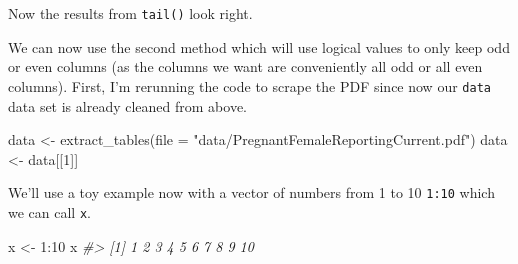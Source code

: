 \documentclass[
]{krantz}
\makeatletter
\newenvironment{Shaded}{\begin{snugshade}}{\end{snugshade}}
\newcommand{\AttributeTok}[1]{\textcolor[rgb]{0.61,0.61,0.61}{#1}}
\newcommand{\CommentTok}[1]{\textcolor[rgb]{0.37,0.37,0.37}{\textit{#1}}}
\newcommand{\DecValTok}[1]{\textcolor[rgb]{0.06,0.06,0.06}{#1}}
\newcommand{\FunctionTok}[1]{\textcolor[rgb]{0,0,0}{#1}}
\newcommand{\NormalTok}[1]{#1}
\newcommand{\OtherTok}[1]{\textcolor[rgb]{0.37,0.37,0.37}{#1}}
\newcommand{\SpecialCharTok}[1]{\textcolor[rgb]{0,0,0}{#1}}
\newcommand{\StringTok}[1]{\textcolor[rgb]{0.5,0.5,0.5}{#1}}
\newenvironment{kframe}{%
\medskip{}
\setlength{\fboxsep}{.8em}
 \def\at@end@of@kframe{}%
 \ifinner\ifhmode%
  \def\at@end@of@kframe{\end{minipage}}%
  \begin{minipage}{\columnwidth}%
 \fi\fi%
 \def\FrameCommand##1{\hskip\@totalleftmargin \hskip-\fboxsep
 \colorbox{shadecolor}{##1}\hskip-\fboxsep
     \hskip-\linewidth \hskip-\@totalleftmargin \hskip\columnwidth}%
 \MakeFramed {\advance\hsize-\width
   \@totalleftmargin\z@ \linewidth\hsize
   \@setminipage}}%
 {\par\unskip\endMakeFramed%
 \at@end@of@kframe}
\renewenvironment{Shaded}{\begin{kframe}}{\end{kframe}}
\makeatother
\begin{document}
\begin{Shaded}
\end{Shaded}

Now the results from \texttt{tail()} look right.

We can now use the second method which will use logical values to only keep odd or even columns (as the columns we want are conveniently all odd or all even columns). First, I'm rerunning the code to scrape the PDF since now our \texttt{data} data set is already cleaned from above.

\begin{Shaded}
\begin{Highlighting}[]
\NormalTok{data }\OtherTok{\textless{}{-}} \FunctionTok{extract\_tables}\NormalTok{(}\AttributeTok{file =} \StringTok{"data/PregnantFemaleReportingCurrent.pdf"}\NormalTok{)}
\NormalTok{data }\OtherTok{\textless{}{-}}\NormalTok{ data[[}\DecValTok{1}\NormalTok{]]}
\end{Highlighting}
\end{Shaded}

We'll use a toy example now with a vector of numbers from 1 to 10 \texttt{1:10} which we can call \texttt{x}.

\begin{Shaded}
\begin{Highlighting}[]
\NormalTok{x }\OtherTok{\textless{}{-}} \DecValTok{1}\SpecialCharTok{:}\DecValTok{10}
\NormalTok{x}
\CommentTok{\#\textgreater{}  [1]  1  2  3  4  5  6  7  8  9 10}
\end{Highlighting}
\end{Shaded}
\end{document}
